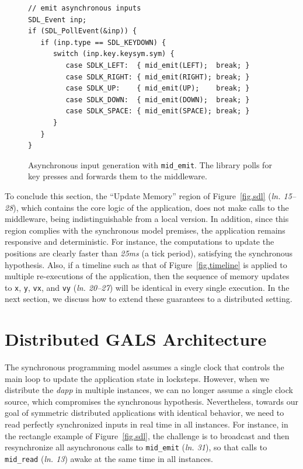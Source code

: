 \documentclass[sigplan,screen]{acmart}
\newcommand{\lin}[1]{(\emph{ln. #1}\xspace)}
\newcommand{\dapp}{\emph{dapp}\xspace}
\begin{document}
\begin{figure}[t]
{\scriptsize
\begin{verbatim}
// emit asynchronous inputs
SDL_Event inp;
if (SDL_PollEvent(&inp)) {
   if (inp.type == SDL_KEYDOWN) {
      switch (inp.key.keysym.sym) {
         case SDLK_LEFT:  { mid_emit(LEFT);  break; }
         case SDLK_RIGHT: { mid_emit(RIGHT); break; }
         case SDLK_UP:    { mid_emit(UP);    break; }
         case SDLK_DOWN:  { mid_emit(DOWN);  break; }
         case SDLK_SPACE: { mid_emit(SPACE); break; }
      }
   }
}
\end{verbatim}
}
  \caption{
    \label{fig.input}
    Asynchronous input generation with \texttt{mid\_emit}.
    The library polls for key presses and forwards them to the middleware.
  }
\end{figure}

To conclude this section, the ``Update Memory'' region of Figure~\ref{fig.sdl}
\lin{15--28}, which contains the core logic of the application, does not make
calls to the
middleware, being indistinguishable from a local version.
In addition, since this region complies with the synchronous model premises,
the application remains responsive and deterministic.
For instance, the computations to update the positions are clearly faster than
\emph{25ms} (a tick period), satisfying the synchronous hypothesis.
Also, if a timeline such as that of Figure~\ref{fig.timeline} is applied to
multiple re-executions of the application, then the sequence of memory updates
to \texttt{x}, \texttt{y}, \texttt{vx}, and \texttt{vy} \lin{20--27} will be
identical in every single execution.
In the next section, we discuss how to extend these guarantees to a distributed
setting.

\section{Distributed GALS Architecture}
\label{sec.gals}

The synchronous programming model assumes a single clock that controls the main
loop to update the application state in locksteps.
However, when we distribute the \dapp in multiple instances, we can no longer
assume a single clock source, which compromises the synchronous hypothesis.
%
Nevertheless, towards our goal of symmetric distributed applications with
identical behavior, we need to read perfectly synchronized inputs in real time
in all instances.
For instance, in the rectangle example of Figure~\ref{fig.sdl}, the challenge
is to broadcast and then resynchronize all asynchronous calls to
\texttt{mid\_emit} \lin{31}, so that calls to \texttt{mid\_read} \lin{13} awake
at the same time in all instances.
\end{document}
